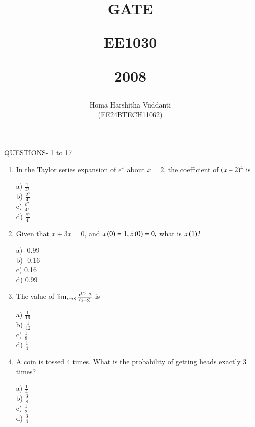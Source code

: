 \documentclass[journal]{IEEEtran}
\begin{document}


\title{
GATE

\large{EE1030}

2008
}
\author{Homa Harshitha Vuddanti

(EE24BTECH11062)
}	

\maketitle

\bigskip

\renewcommand{\thefigure}{\theenumi}
\renewcommand{\thetable}{\theenumi}
QUESTIONS- 1 to 17\\
\begin{enumerate}
   
\item In the Taylor series expansion of $e^x$ about $x=2$, the coefficient of $\left(x-2\right)^4$ is
\begin{multicols}{4}
    a) $\frac{1}{4!}$\\
    b) $\frac{2^4}{4!}$\\
    c) $\frac{e^2}{4!}$\\
    d)  $\frac{e^4}{4!}$
\end{multicols}
 \item Given that $\ddot{x}+3x=0$, and $x\left(0\right)=1,\dot{x}\left(0\right)=0,
$ what is $x\left(1\right)?$

 \begin{multicols}{4}
     a) -0.99\\
     b) -0.16\\
     c) 0.16\\
     d) 0.99
 \end{multicols}
 
 \item The value of $\lim_{x \to 8} \frac{x^{1/3}-2}{\left(x-8\right)}$ is
 \begin{multicols}{4}
    a) $\frac{1}{16}$\\
    b) $\frac{1}{12}$\\
    c)  $\frac{1}{8}$\\
    d)  $\frac{1}{4}$
 \end{multicols}
 
\item A coin is tossed 4 times. What is the probability of getting heads exactly 3 times?
\begin{multicols}{4}
    a) $\frac{1}{4}$\\
    b) $\frac{3}{8}$\\
    c)  $\frac{1}{2}$\\
    d)  $\frac{3}{4}$
\end{multicols}


\end{enumerate}
\end{document}
